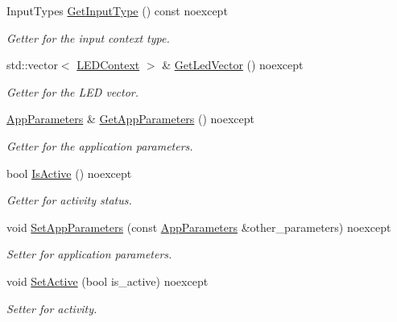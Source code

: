 \begin{DoxyCompactItemize}
\item 
\mbox{\label{classBaseInputContext_a4caeb00d25a397c8e7d699cd12326d89}} 
Input\+Types \hyperlink{classBaseInputContext_a4caeb00d25a397c8e7d699cd12326d89}{Get\+Input\+Type} () const noexcept
\begin{DoxyCompactList}\small\item\em Getter for the input context type. \end{DoxyCompactList}\item 
\mbox{\label{classBaseInputContext_a990115f776002c595e3db3672301717d}} 
std\+::vector$<$ \hyperlink{classLEDContext}{L\+E\+D\+Context} $>$ \& \hyperlink{classBaseInputContext_a990115f776002c595e3db3672301717d}{Get\+Led\+Vector} () noexcept
\begin{DoxyCompactList}\small\item\em Getter for the L\+ED vector. \end{DoxyCompactList}\item 
\mbox{\label{classBaseInputContext_a3bbc32088faaf895d3cf1503bac2fb2f}} 
\hyperlink{structAppParameters}{App\+Parameters} \& \hyperlink{classBaseInputContext_a3bbc32088faaf895d3cf1503bac2fb2f}{Get\+App\+Parameters} () noexcept
\begin{DoxyCompactList}\small\item\em Getter for the application parameters. \end{DoxyCompactList}\item 
\mbox{\label{classBaseInputContext_ae6cc650533200b4f4c5f9c5dfdd19023}} 
bool \hyperlink{classBaseInputContext_ae6cc650533200b4f4c5f9c5dfdd19023}{Is\+Active} () noexcept
\begin{DoxyCompactList}\small\item\em Getter for activity status. \end{DoxyCompactList}\item 
\mbox{\label{classBaseInputContext_a3e3c544f5658e379a71228680a05b700}} 
void \hyperlink{classBaseInputContext_a3e3c544f5658e379a71228680a05b700}{Set\+App\+Parameters} (const \hyperlink{structAppParameters}{App\+Parameters} \&other\+\_\+parameters) noexcept
\begin{DoxyCompactList}\small\item\em Setter for application parameters. \end{DoxyCompactList}\item 
\mbox{\label{classBaseInputContext_a31b87d03f2c28333e2b2a0bd746746d5}} 
void \hyperlink{classBaseInputContext_a31b87d03f2c28333e2b2a0bd746746d5}{Set\+Active} (bool is\+\_\+active) noexcept
\begin{DoxyCompactList}\small\item\em Setter for activity. \end{DoxyCompactList}\end{DoxyCompactItemize}
